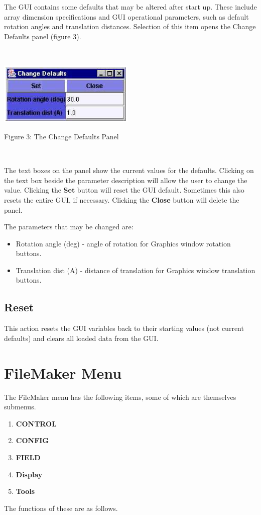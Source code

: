 The GUI contains some defaults that may be altered after start up.  These
include array dimension specifications and GUI operational parameters, such as
default rotation angles and translation distances. Selection of this item
opens the Change Defaults panel (figure 3).

~

\vskip 5mm
\centerline{\includegraphics[height=3.0cm]{defaults.ps}}
\centerline{Figure 3: The Change Defaults Panel}
\vskip 5mm

~

\noindent
The text boxes on the panel show the current values for the defaults.
Clicking on the text box beside the parameter description will allow
the user to change the value. Clicking the {\bf Set} button will reset
the GUI default. Sometimes this also resets the entire GUI, if necessary.
Clicking the {\bf Close} button will delete the panel.

The parameters that may be changed are:
\begin{itemize}
\item Rotation angle (deg) - angle of rotation for Graphics window
rotation buttons.
\item Translation dist (A) - distance of translation for Graphics
window translation buttons.
\end{itemize}

\subsection{Reset}

This action resets the GUI variables back to their starting values
(not current defaults) and clears all loaded data from the GUI.

\section{FileMaker Menu}

The FileMaker menu has the following items, some of which are
themselves submenus.
\begin{enumerate}
\item {\bf CONTROL}
\item {\bf CONFIG}
\item {\bf FIELD}
\item {\bf Display}
\item {\bf Tools}
\end{enumerate}
The functions of these are as follows.

